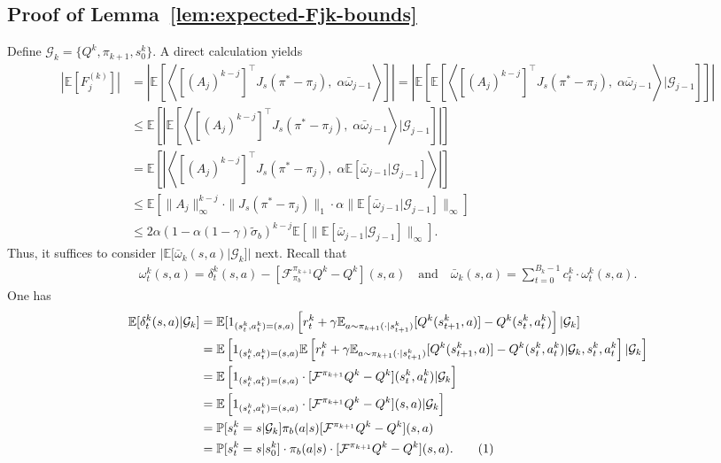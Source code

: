 \documentclass[10pt]{article}
\newcommand{\ls}{\left}
\newcommand{\rs}{\right}
\newcommand\numberthis{\addtocounter{equation}{1}\tag{\theequation}}
\theoremstyle{plain}
\theoremstyle{definition}
\begin{document}
\subsection{Proof of Lemma~\ref{lem:expected-Fjk-bounds}}\label{sec:expected-Fjk-bound}
Define 
$
\mathcal{G}_{k}=\{Q^k,\pi_{k+1},s_0^k\}.
$ A direct calculation yields 
\begin{align*}
\ls|\mathbb{E}\ls[F_j^{(k)}\rs]\rs|&=\ls|\mathbb{E}\ls[\ls\langle \ls[(A_j)^{k-j}\rs]^\top J_s(\pi^*-\pi_j), \;\alpha\bar{\omega}_{j-1}\rs\rangle\rs]\rs|=
\ls|\mathbb{E}\ls[\mathbb{E}\ls[\ls\langle \ls[(A_j)^{k-j}\rs]^\top J_s(\pi^*-\pi_j), \;\alpha\bar{\omega}_{j-1}\rs\rangle \Big |\mathcal{G}_{j-1}\rs]\rs]\rs|\\
&\leq \mathbb{E}\ls[\left|\mathbb{E}\ls[\ls\langle \ls[(A_j)^{k-j}\rs]^\top J_s(\pi^*-\pi_j), \;\alpha\bar{\omega}_{j-1}\rs\rangle\Big |\mathcal{G}_{j-1}\rs]\right|\rs]\\
&=\mathbb{E}\ls[\left|\ls\langle \ls[(A_j)^{k-j}\rs]^\top J_s(\pi^*-\pi_j), \;\alpha\mathbb{E}[\bar{\omega}_{j-1}|\mathcal{G}_{j-1}]\rs\rangle\right|\rs]\\
&\leq \mathbb{E}[\|A_j\|_\infty^{k-j}\cdot\|J_s(\pi^*-\pi_j)\|_1\cdot\alpha\|\mathbb{E}[\bar{\omega}_{j-1}|\mathcal{G}_{j-1}]\|_\infty]\\
&\leq 2\alpha(1-\alpha(1-\gamma)\tilde{\sigma}_b)^{k-j}\mathbb{E}[\|\mathbb{E}[\bar{\omega}_{j-1}|\mathcal{G}_{j-1}]\|_\infty].
\end{align*}
Thus, it suffices to consider $|\mathbb{E}[\bar{\omega}_{k}(s,a)|\mathcal{G}_{k}]|$ next.  Recall that
\begin{align*}
\omega_t^k(s,a)=\delta_{t}^k(s,a)-[\mathcal{F}^{\pi_{k+1}}_{\pi_b}Q^k-Q^k](s,a)
\quad\mbox{and}\quad
\bar{\omega}_k(s,a)=\sum_{t=0}^{B_k-1}c_t^k\cdot\omega_t^k(s,a).
\end{align*}
One has 
\begin{align*}
    \mathbb{E}[\delta_t^k(s,a)|\mathcal{G}_k]&=\mathbb{E}[1_{(s_t^{k},a^{k}_t)=(s,a)}\left[r^{k}_t+\gamma\mathbb{E}_{a\sim\pi_{k+1}(\cdot|s_{t+1}^{k})}[Q^{k}(s^{k}_{t+1},a)]-Q^{k}(s^{k}_t,a^{k}_t)\right]|\mathcal{G}_k]\\
    &=\mathbb{E}\left[1_{(s_t^{k},a^{k}_t)=(s,a)}\mathbb{E}\left[r^{k}_t+\gamma\mathbb{E}_{a\sim\pi_{k+1}(\cdot|s_{t+1}^{k})}[Q^{k}(s^{k}_{t+1},a)]-Q^{k}(s^{k}_t,a^{k}_t)|\mathcal{G}_k,s_t^k,a_t^k\right]|\mathcal{G}_k\right]\\
    &=\mathbb{E}\left[1_{(s_t^{k},a^{k}_t)=(s,a)}\cdot[\mathcal{F}^{\pi_{k+1}}Q^k-Q^k](s_t^k,a_t^k)|\mathcal{G}_k\right]\\
    &=\mathbb{E}\left[1_{(s_t^{k},a^{k}_t)=(s,a)}\cdot[\mathcal{F}^{\pi_{k+1}}Q^k-Q^k](s,a)|\mathcal{G}_k\right]\\
    &=\mathbb{P}[s_t^k=s|\mathcal{G}_k]\pi_b(a|s)[\mathcal{F}^{\pi_{k+1}}Q^k-Q^k](s,a)\\
    &=\mathbb{P}[s_t^k=s|s_0^k]\cdot\pi_b(a|s)\cdot [\mathcal{F}^{\pi_{k+1}}Q^k-Q^k](s,a). \numberthis \label{eq:Expected-TD-AC-PMD:delta-expectation}
\end{align*}
\end{document}
